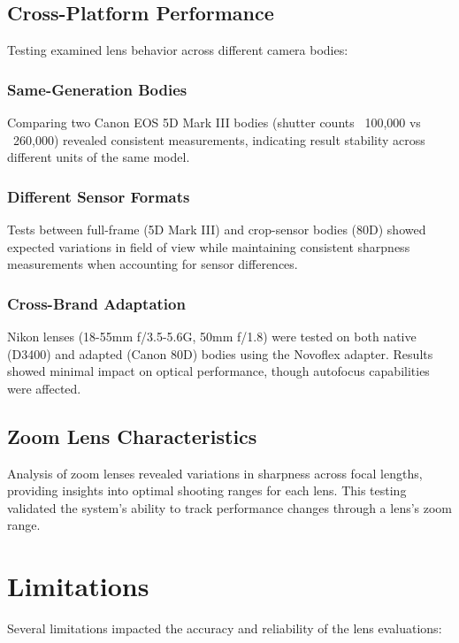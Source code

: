 \subsection{Cross-Platform Performance}
Testing examined lens behavior across different camera bodies:

\subsubsection{Same-Generation Bodies}
Comparing two Canon EOS 5D Mark III bodies (shutter counts ~100,000 vs ~260,000) revealed consistent measurements, indicating result stability across different units of the same model.

\subsubsection{Different Sensor Formats}
Tests between full-frame (5D Mark III) and crop-sensor bodies (80D) showed expected variations in field of view while maintaining consistent sharpness measurements when accounting for sensor differences.

\subsubsection{Cross-Brand Adaptation}
Nikon lenses (18-55mm f/3.5-5.6G, 50mm f/1.8) were tested on both native (D3400) and adapted (Canon 80D) bodies using the Novoflex adapter. Results showed minimal impact on optical performance, though autofocus capabilities were affected.

\subsection{Zoom Lens Characteristics}
Analysis of zoom lenses revealed variations in sharpness across focal lengths, providing insights into optimal shooting ranges for each lens. This testing validated the system's ability to track performance changes through a lens's zoom range.

\section{Limitations}
Several limitations impacted the accuracy and reliability of the lens evaluations:

